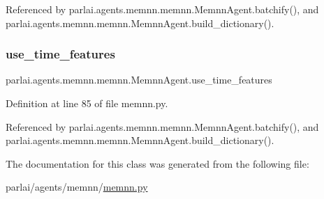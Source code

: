 Referenced by parlai.\+agents.\+memnn.\+memnn.\+Memnn\+Agent.\+batchify(), and parlai.\+agents.\+memnn.\+memnn.\+Memnn\+Agent.\+build\+\_\+dictionary().

\mbox{\label{classparlai_1_1agents_1_1memnn_1_1memnn_1_1MemnnAgent_a259eb74db201a70a8f82f160860d7b88}} 
\subsubsection{\texorpdfstring{use\+\_\+time\+\_\+features}{use\_time\_features}}
{\footnotesize\ttfamily parlai.\+agents.\+memnn.\+memnn.\+Memnn\+Agent.\+use\+\_\+time\+\_\+features}



Definition at line 85 of file memnn.\+py.



Referenced by parlai.\+agents.\+memnn.\+memnn.\+Memnn\+Agent.\+batchify(), and parlai.\+agents.\+memnn.\+memnn.\+Memnn\+Agent.\+build\+\_\+dictionary().



The documentation for this class was generated from the following file\+:\begin{DoxyCompactItemize}
\item 
parlai/agents/memnn/\hyperlink{memnn_8py}{memnn.\+py}\end{DoxyCompactItemize}
